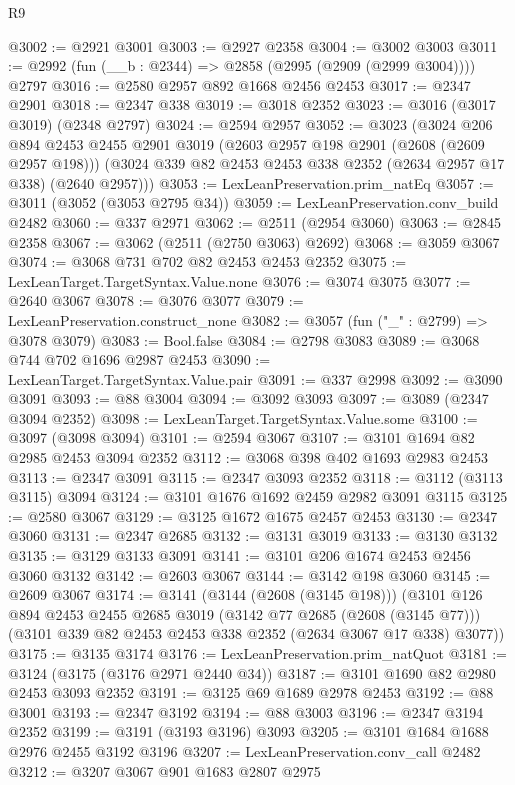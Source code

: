 \begin{lexlean}{R9}
\begin{coremodule}
@3002 := @2921 @3001
@3003 := @2927 @2358
@3004 := @3002 @3003
@3011 := @2992 (fun (__b : @2344) => @2858 (@2995 (@2909 (@2999 @3004)))) @2797
@3016 := @2580 @2957 @892 @1668 @2456 @2453
@3017 := @2347 @2901
@3018 := @2347 @338
@3019 := @3018 @2352
@3023 := @3016 (@3017 @3019) (@2348 @2797)
@3024 := @2594 @2957
@3052 := @3023
    (@3024
      @206
      @894
      @2453
      @2455
      @2901
      @3019
      (@2603 @2957 @198 @2901 (@2608 (@2609 @2957 @198)))
      (@3024 @339 @82 @2453 @2453 @338 @2352 (@2634 @2957 @17 @338) (@2640 @2957)))
@3053 := LexLeanPreservation.prim_natEq
@3057 := @3011 (@3052 (@3053 @2795 @34))
@3059 := LexLeanPreservation.conv_build @2482
@3060 := @337 @2971
@3062 := @2511 (@2954 @3060)
@3063 := @2845 @2358
@3067 := @3062 (@2511 (@2750 @3063) @2692)
@3068 := @3059 @3067
@3074 := @3068 @731 @702 @82 @2453 @2453 @2352
@3075 := LexLeanTarget.TargetSyntax.Value.none
@3076 := @3074 @3075
@3077 := @2640 @3067
@3078 := @3076 @3077
@3079 := LexLeanPreservation.construct_none
@3082 := @3057 (fun ("_" : @2799) => @3078 @3079)
@3083 := Bool.false
@3084 := @2798 @3083
@3089 := @3068 @744 @702 @1696 @2987 @2453
@3090 := LexLeanTarget.TargetSyntax.Value.pair
@3091 := @337 @2998
@3092 := @3090 @3091
@3093 := @88 @3004
@3094 := @3092 @3093
@3097 := @3089 (@2347 @3094 @2352)
@3098 := LexLeanTarget.TargetSyntax.Value.some
@3100 := @3097 (@3098 @3094)
@3101 := @2594 @3067
@3107 := @3101 @1694 @82 @2985 @2453 @3094 @2352
@3112 := @3068 @398 @402 @1693 @2983 @2453
@3113 := @2347 @3091
@3115 := @2347 @3093 @2352
@3118 := @3112 (@3113 @3115) @3094
@3124 := @3101 @1676 @1692 @2459 @2982 @3091 @3115
@3125 := @2580 @3067
@3129 := @3125 @1672 @1675 @2457 @2453
@3130 := @2347 @3060
@3131 := @2347 @2685
@3132 := @3131 @3019
@3133 := @3130 @3132
@3135 := @3129 @3133 @3091
@3141 := @3101 @206 @1674 @2453 @2456 @3060 @3132
@3142 := @2603 @3067
@3144 := @3142 @198 @3060
@3145 := @2609 @3067
@3174 := @3141
    (@3144 (@2608 (@3145 @198)))
    (@3101
      @126
      @894
      @2453
      @2455
      @2685
      @3019
      (@3142 @77 @2685 (@2608 (@3145 @77)))
      (@3101 @339 @82 @2453 @2453 @338 @2352 (@2634 @3067 @17 @338) @3077))
@3175 := @3135 @3174
@3176 := LexLeanPreservation.prim_natQuot
@3181 := @3124 (@3175 (@3176 @2971 @2440 @34))
@3187 := @3101 @1690 @82 @2980 @2453 @3093 @2352
@3191 := @3125 @69 @1689 @2978 @2453
@3192 := @88 @3001
@3193 := @2347 @3192
@3194 := @88 @3003
@3196 := @2347 @3194 @2352
@3199 := @3191 (@3193 @3196) @3093
@3205 := @3101 @1684 @1688 @2976 @2455 @3192 @3196
@3207 := LexLeanPreservation.conv_call @2482
@3212 := @3207 @3067 @901 @1683 @2807 @2975

\end{coremodule}
\end{lexlean}
